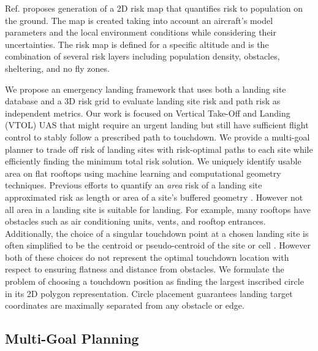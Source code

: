 Ref. \cite{primatesta_ground_2020} proposes generation of a 2D risk map that quantifies  risk to population on the ground. The map is created taking into account an aircraft's model parameters and the local environment conditions while considering their uncertainties. The risk map is defined for a specific altitude and is the combination of several risk layers including population density, obstacles, sheltering, and no fly zones.

We propose an emergency landing framework that uses both a landing site database and a 3D risk grid to evaluate landing site risk and path risk as independent metrics. Our work is focused on Vertical Take-Off and Landing (VTOL) \ac{UAS} that might require an urgent landing but still have sufficient flight control to stably follow a prescribed path to touchdown. We provide a  multi-goal planner to trade off risk of landing sites with risk-optimal paths to each site while efficiently finding the minimum total risk solution. We uniquely identify usable area on flat rooftops using machine learning and computational geometry techniques. Previous efforts to quantify an \emph{area} risk of a landing site approximated risk as length or area of a site's buffered geometry \cite{di_donato_evaluating_2017}. However not all area in a landing site is suitable for landing. For example, many rooftops have obstacles such as air conditioning units, vents, and rooftop entrances. Additionally, the choice of a singular touchdown point at a chosen landing site is often simplified to be the centroid or pseudo-centroid of the site or cell \cite{di_donato_evaluating_2017, mejias_alvarez_forced_2009}. However both of these choices do not represent the optimal touchdown location with respect to ensuring flatness and distance from obstacles. We formulate the problem of choosing a touchdown position as finding the largest inscribed circle in its 2D polygon representation. Circle placement guarantees landing target coordinates are maximally separated from any obstacle or edge. 


\subsection{Multi-Goal Planning}\label{sec:ch5_multi_goal_bg}

